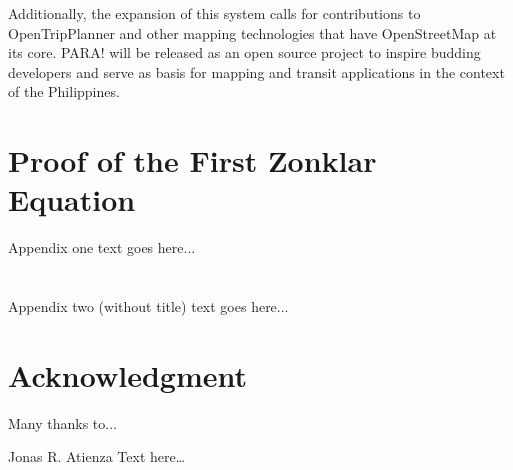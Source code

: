 \documentclass[journal]{./IEEE/IEEEtran}
\begin{document}
Additionally, the expansion of this system calls for contributions to OpenTripPlanner and other mapping technologies that have OpenStreetMap at its core. PARA! will be released as an open source project to inspire budding developers and serve as basis for mapping and transit applications in the context of the Philippines.

\appendices

\section{Proof of the First Zonklar Equation}
Appendix one text goes here...

\section{}
Appendix two (without title) text goes here...

\section*{Acknowledgment}
Many thanks to...




\begin{biography}{Jonas R. Atienza}
Text here\ldots
\end{biography}
\end{document}
